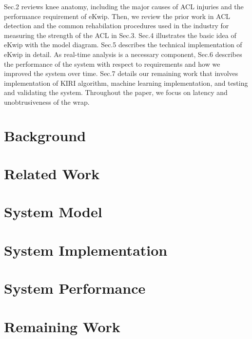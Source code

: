 \documentclass{sig-alternate}
\begin{document}
Sec.2 reviews knee anatomy, including the major causes of ACL injuries and the performance requirement of eKwip. Then, we review the prior work in ACL detection and the common rehabilation procedures used in the industry for measuring the strength of the ACL in Sec.3. Sec.4 illustrates the basic idea of eKwip with the model diagram. Sec.5 describes the technical implementation of eKwip in detail. As real-time analysis is a necessary component, Sec.6 describes the performance of the system with respect to requirements and how we improved the system over time. Sec.7 details our remaining work that involves implementation of KIRI algorithm, machine learning implementation, and testing and validating the system. Throughout the paper, we focus on latency and unobtrusiveness of the wrap.

\section{Background}
\label{sec:background}


\section{Related Work}
\label{sec:related_work}


\section{System Model}
\label{sec:system_model}


\section{System Implementation}
\label{subsec:system_implementation}


\section{System Performance}
\label{subsec:system_performance}


\section{Remaining Work}
\label{subsec:remaining_work}


\end{document}
